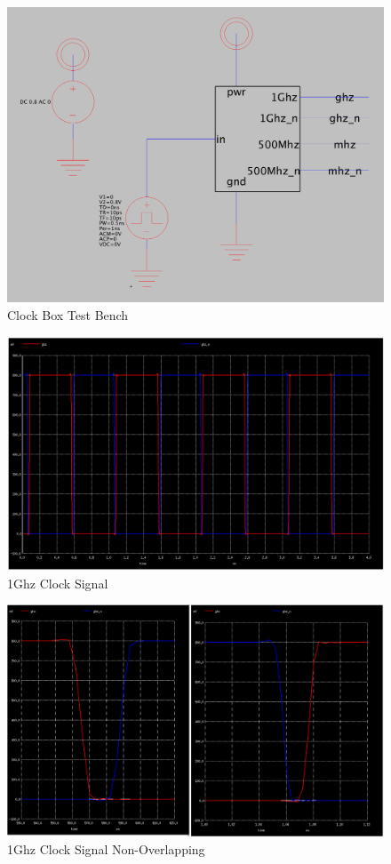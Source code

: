 \documentclass[a4paper]{article}
\begin{document}
\begin{figure}[H]
	\centering
	\includegraphics[scale=0.26]{clockBoxTest}
	\caption{Clock Box Test Bench}
	\label{fig:clockBoxTest}
\end{figure}

\begin{figure}[H]
	\centering
	\includegraphics[scale=0.26]{clockGhz}
	\caption{1Ghz Clock Signal}
	\label{fig:clockGhz}
\end{figure}

\begin{figure}[H]
	\centering
	\includegraphics[scale=0.26]{clockGhzOverlap}
	\caption{1Ghz Clock Signal Non-Overlapping}
	\label{fig:clockGhzOverlap}
\end{figure}
\end{document}

